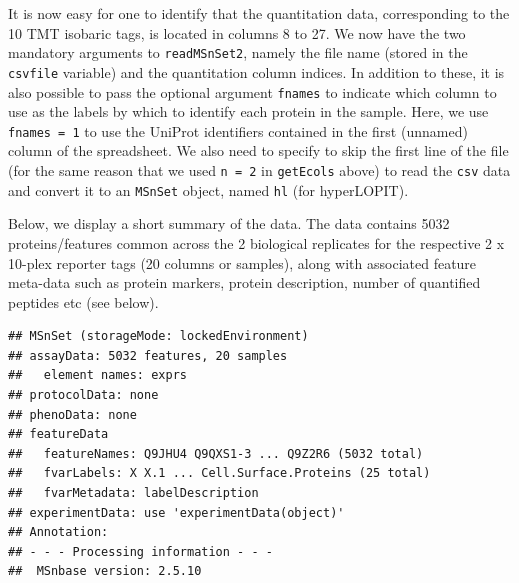 It is now easy for one to identify that the quantitation data,
corresponding to the 10 TMT isobaric tags, is located in columns 8
to 27. We now have the two mandatory arguments to \texttt{readMSnSet2},
namely the file name (stored in the \texttt{csvfile} variable) and the
quantitation column indices. In addition to these, it is also possible
to pass the optional argument \texttt{fnames} to indicate which column to use
as the labels by which to identify each protein in the sample. Here,
we use \texttt{fnames = 1} to use the UniProt identifiers contained in the
first (unnamed) column of the spreadsheet. We also need to specify to
skip the first line of the file (for the same reason that we used 
\texttt{n = 2} in \texttt{getEcols} above) to read the \texttt{csv} data and convert it to an
\texttt{MSnSet} object, named \texttt{hl} (for hyperLOPIT).

\begin{knitrout}
\color{fgcolor}\begin{kframe}
\begin{alltt}
 \hlkwb{<-}   \hlstd{=} \hlopt{:}\hlstd{,}  \hlstd{=} \hlstd{,}  \hlstd{=} \hlstd{)}
\end{alltt}
\end{kframe}
\end{knitrout}

Below, we display a short summary of the data. The data contains 
5032 proteins/features common across the 2 biological replicates
for the respective 2 x 10-plex reporter tags (20
columns or samples), along with associated feature meta-data such as
protein markers, protein description, number of quantified peptides
etc (see below).


\begin{knitrout}
\color{fgcolor}\begin{kframe}
\begin{alltt}
\end{alltt}
\begin{verbatim}
## MSnSet (storageMode: lockedEnvironment)
## assayData: 5032 features, 20 samples 
##   element names: exprs 
## protocolData: none
## phenoData: none
## featureData
##   featureNames: Q9JHU4 Q9QXS1-3 ... Q9Z2R6 (5032 total)
##   fvarLabels: X X.1 ... Cell.Surface.Proteins (25 total)
##   fvarMetadata: labelDescription
## experimentData: use 'experimentData(object)'
## Annotation:  
## - - - Processing information - - -
##  MSnbase version: 2.5.10
\end{verbatim}
\end{kframe}
\end{knitrout}

